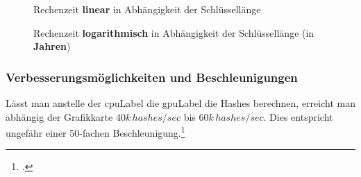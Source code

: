 \begin{figure}[H]
	\begin{minipage}[b]{.45\linewidth}
	   	\pgfplotsset{width=1.0\textwidth, height=0.7\textwidth}
		\centering
		\label{fig:1a}
	\end{minipage}%
	\begin{minipage}[b]{.45\linewidth}
		\pgfplotsset{width=1.0\textwidth, height=0.7\textwidth}
		\centering
		\label{fig:1b}
	\end{minipage}
	\caption{Rechenzeit \textbf{linear} in Abhängigkeit der Schlüssellänge}\label{fig:1}
	\label{fig:wpa_attack_linear}
\end{figure}

\begin{figure}[H]
	\begin{minipage}[b]{.65\linewidth}
		\pgfplotsset{width=1.0\textwidth, height=0.7\textwidth}
		\centering
	\end{minipage}
	\caption{Rechenzeit \textbf{logarithmisch} in Abhängigkeit der Schlüssellänge (in \textbf{Jahren})}\label{fig:}
	\label{fig:wpa_attack_log}
\end{figure}


\subsubsection{Verbesserungsmöglichkeiten und Beschleunigungen}
Lässt man anstelle der \gls{cpuLabel} die \gls{gpuLabel} die Hashes berechnen, erreicht man abhängig der Grafikkarte $40k\,hashes/sec$ bis $60k\,hashes/sec$. Dies entspricht ungefähr einer 50-fachen Beschleunigung.\footcite[][158]{WrightCache201503}

